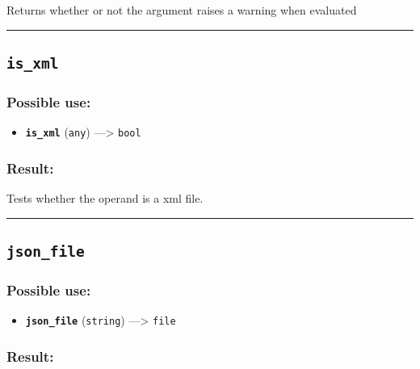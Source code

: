 \documentclass[]{book}
\providecommand{\tightlist}{%
  \setlength{\itemsep}{0pt}\setlength{\parskip}{0pt}}
\theoremstyle{definition}
\theoremstyle{definition}
\theoremstyle{definition}
\theoremstyle{remark}
\begin{document}
Returns whether or not the argument raises a warning when evaluated

\begin{center}\rule{0.5\linewidth}{\linethickness}\end{center}

\subsection{\texorpdfstring{\texttt{is\_xml}}{is\_xml}}\label{is_xml}

\subsubsection{Possible use:}\label{possible-use-309}

\begin{itemize}
\tightlist
\item
  \textbf{\texttt{is\_xml}} (\texttt{any}) ---\textgreater{}
  \texttt{bool}
\end{itemize}

\subsubsection{Result:}\label{result-299}

Tests whether the operand is a xml file.

\begin{center}\rule{0.5\linewidth}{\linethickness}\end{center}

\subsection{\texorpdfstring{\texttt{json\_file}}{json\_file}}\label{json_file}

\subsubsection{Possible use:}\label{possible-use-310}

\begin{itemize}
\tightlist
\item
  \textbf{\texttt{json\_file}} (\texttt{string}) ---\textgreater{}
  \texttt{file}
\end{itemize}

\subsubsection{Result:}\label{result-300}
\end{document}
